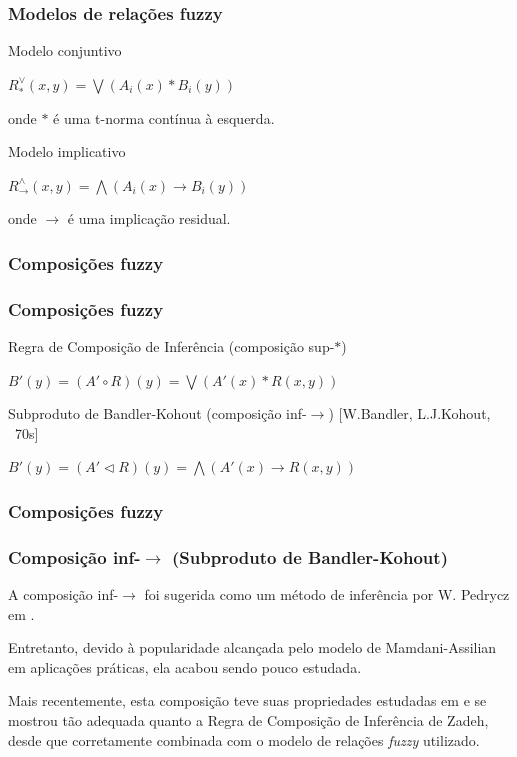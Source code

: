 \documentclass{beamer}
\theoremstyle{definition}
\begin{document}
\begin{frame}
\frametitle{Modelos de relações fuzzy}
\begin{block}{Modelo conjuntivo}
\begin{center}
$R^{\vee}_{\ast}(x,y) = \bigvee (A_{i}(x) \ast B_{i}(y))$
\end{center}
onde $\ast$ é uma t-norma contínua à esquerda.
\end{block}

\begin{block}{Modelo implicativo}
\begin{center}
$R^{\wedge}_{\rightarrow}(x,y) = \bigwedge (A_{i}(x) \rightarrow B_{i}(y))$
\end{center}
onde $\rightarrow$ é uma implicação residual.
\end{block}
\end{frame}


\begin{frame}
\frametitle{Composições fuzzy}
\end{frame}

\begin{frame}
\frametitle{Composições fuzzy}
\begin{block}{Regra de Composição de Inferência (composição sup-$\ast$) \cite{p15}}
\begin{center}
$B'(y) = (A' \circ R)(y) = \bigvee (A'(x) \ast R(x,y))$
\end{center}
\end{block}

\begin{block}{Subproduto de Bandler-Kohout (composição inf-$\rightarrow$) [W.Bandler, L.J.Kohout, ~70s]}
\begin{center}
$B'(y) = (A' \vartriangleleft R)(y) = \bigwedge (A'(x) \rightarrow R(x,y))$
\end{center}
\end{block}
\end{frame}

\begin{frame}
\frametitle{Composições fuzzy}
\end{frame}


\begin{frame}
\frametitle{Composição inf-$\rightarrow$ (Subproduto de Bandler-Kohout)}
A composição inf-$\rightarrow$ foi sugerida como um método de inferência por W. Pedrycz em \cite{p17}.\par
Entretanto, devido à popularidade alcançada pelo modelo de Mamdani-Assilian em aplicações práticas, ela acabou sendo pouco estudada.\par
Mais recentemente, esta composição teve suas propriedades estudadas em \cite{p2} e se mostrou tão adequada quanto a Regra de Composição de Inferência de Zadeh, desde que corretamente combinada com o modelo de relações \textit{fuzzy} utilizado.
\end{frame}
\end{document}
